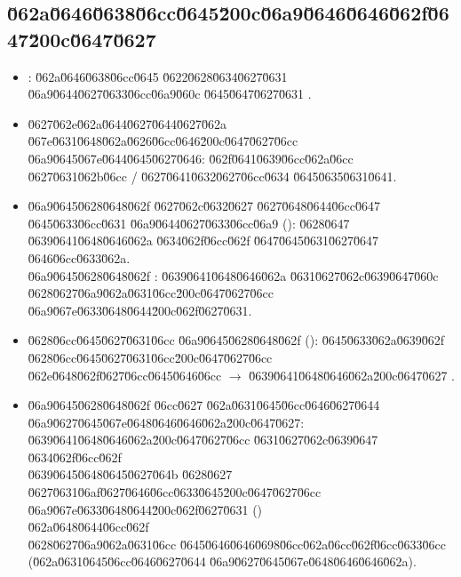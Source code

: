 \documentclass[12pt,a4paper]{article}
\begin{document}
\subsection*{\u062a\u0646\u0638\u06cc\u0645\u200c\u06a9\u0646\u0646\u062f\u0647\u200c\u0647\u0627}
\begin{itemize}
\item {}: \u062a\u0646\u0638\u06cc\u0645 \u0622\u0628\u0634\u0627\u0631 \u06a9\u0644\u0627\u0633\u06cc\u06a9\u060c \u0645\u0647\u0627\u0631 .
\item \u0627\u062e\u062a\u0644\u0627\u0644\u0627\u062a \u067e\u0631\u0648\u062a\u0626\u06cc\u0646\u200c\u0647\u0627\u06cc \u06a9\u0645\u067e\u0644\u0645\u0627\u0646: \u062f\u0641\u0639\u06cc\u062a\u06cc \u0627\u0631\u062b\u06cc / \u0627\u0641\u0632\u0627\u06cc\u0634 \u0645\u0635\u0631\u0641.
\item \u06a9\u0645\u0628\u0648\u062f \u0627\u062c\u0632\u0627 \u0627\u0648\u0644\u06cc\u0647 \u0645\u0633\u06cc\u0631 \u06a9\u0644\u0627\u0633\u06cc\u06a9 (): \u0628\u0647 \u0639\u0641\u0648\u0646\u062a \u0634\u062f\u06cc\u062f \u0647\u0645\u0631\u0627\u0647 \u0646\u06cc\u0633\u062a. \\
\u06a9\u0645\u0628\u0648\u062f : \u0639\u0641\u0648\u0646\u062a \u0631\u0627\u062c\u0639\u0647\u060c \u0628\u0627\u06a9\u062a\u0631\u06cc\u200c\u0647\u0627\u06cc \u06a9\u067e\u0633\u0648\u0644\u200c\u062f\u0627\u0631.
\item \u0628\u06cc\u0645\u0627\u0631\u06cc \u06a9\u0645\u0628\u0648\u062f (): \u0645\u0633\u062a\u0639\u062f \u0628\u06cc\u0645\u0627\u0631\u06cc\u200c\u0647\u0627\u06cc \u062e\u0648\u062f\u0627\u06cc\u0645\u0646\u06cc $\rightarrow$ \u0639\u0641\u0648\u0646\u062a\u200c\u0647\u0627 .
\item \u06a9\u0645\u0628\u0648\u062f  \u06cc\u0627 \u062a\u0631\u0645\u06cc\u0646\u0627\u0644 \u06a9\u0627\u0645\u067e\u0648\u0646\u0646\u062a\u200c\u0647\u0627: \u0639\u0641\u0648\u0646\u062a\u200c\u0647\u0627\u06cc \u0631\u0627\u062c\u0639\u0647 \u0634\u062f\u06cc\u062f \\
\u0639\u0645\u0648\u0645\u0627\u064b \u0628\u0627 \u0627\u0631\u06af\u0627\u0646\u06cc\u0633\u0645\u200c\u0647\u0627\u06cc \u06a9\u067e\u0633\u0648\u0644\u200c\u062f\u0627\u0631 () \\
\u062a\u0648\u0644\u06cc\u062f  \\
\u0628\u0627\u06a9\u062a\u0631\u06cc \u0645\u0646\u0646\u0698\u06cc\u062a\u06cc\u062f\u06cc\u0633\u06cc (\u062a\u0631\u0645\u06cc\u0646\u0627\u0644 \u06a9\u0627\u0645\u067e\u0648\u0646\u0646\u062a).

\end{itemize}
\end{document}
